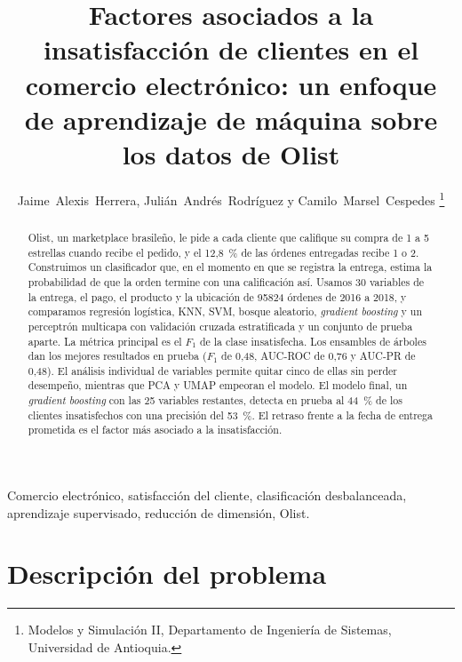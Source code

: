 \documentclass[journal]{IEEEtran}
\begin{document}
\title{Factores asociados a la insatisfacción de clientes en el comercio electrónico: un enfoque de aprendizaje de máquina sobre los datos de Olist}

\author{Jaime~Alexis~Herrera, Julián~Andrés~Rodríguez y Camilo~Marsel~Cespedes%
\thanks{Modelos y Simulación II, Departamento de Ingeniería de Sistemas, Universidad de Antioquia.}}


\maketitle

\begin{abstract}
Olist, un marketplace brasileño, le pide a cada cliente que califique su compra de 1 a 5 estrellas cuando recibe el pedido, y el 12,8~\% de las órdenes entregadas recibe 1 o 2. Construimos un clasificador que, en el momento en que se registra la entrega, estima la probabilidad de que la orden termine con una calificación así. Usamos 30 variables de la entrega, el pago, el producto y la ubicación de \num{95824} órdenes de 2016 a 2018, y comparamos regresión logística, KNN, SVM, bosque aleatorio, \emph{gradient boosting} y un perceptrón multicapa con validación cruzada estratificada y un conjunto de prueba aparte. La métrica principal es el $F_1$ de la clase insatisfecha. Los ensambles de árboles dan los mejores resultados en prueba ($F_1$ de 0,48, AUC-ROC de 0,76 y AUC-PR de 0,48). El análisis individual de variables permite quitar cinco de ellas sin perder desempeño, mientras que PCA y UMAP empeoran el modelo. El modelo final, un \emph{gradient boosting} con las 25 variables restantes, detecta en prueba al 44~\% de los clientes insatisfechos con una precisión del 53~\%. El retraso frente a la fecha de entrega prometida es el factor más asociado a la insatisfacción.
\end{abstract}

\renewcommand{\IEEEkeywordsname}{Palabras clave}
\begin{IEEEkeywords}
Comercio electrónico, satisfacción del cliente, clasificación desbalanceada, aprendizaje supervisado, reducción de dimensión, Olist.
\end{IEEEkeywords}


\section{Descripción del problema}
\end{document}
